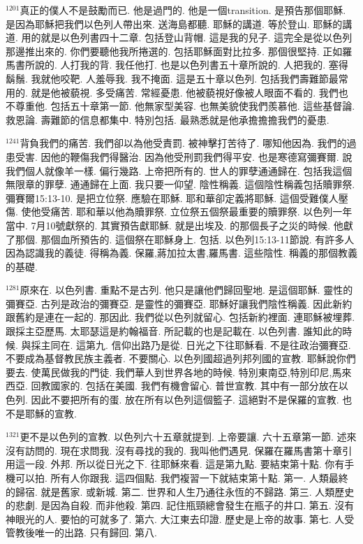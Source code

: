 \documentclass{book}
\begin{document}
$^{1201}$真正的僕人不是鼓勵而已.
他是過門的.
他是一個transition.
是預告那個耶穌.
是因為耶穌把我們以色列人帶出來.
送海島都聽.
耶穌的講道.
等於登山.
耶穌的講道.
用的就是以色列書四十二章.
包括登山背帽.
這是我的兒子.
這完全是從以色列那邊推出來的.
你們要聽他我所捲選的.
包括耶穌面對比拉多.
那個很堅持.
正如羅馬書所說的.
人打我的背.
我任他打.
也是以色列書五十章所說的.
人把我的.
塞得鬍鬚.
我就他咬靶.
人羞辱我.
我不掩面.
這是五十章以色列.
包括我們壽難節最常用的.
就是他被藐視.
多受痛苦.
常經憂患.
他被藐視好像被人眼面不看的.
我們也不尊重他.
包括五十章第一節.
他無家型美容.
也無美貌使我們羨慕他.
這些基督論.
救恩論.
壽難節的信息都集中.
特別包括.
最熟悉就是他承擔擔擔我們的憂患.

$^{1241}$背負我們的痛苦.
我們卻以為他受責罰.
被神擊打苦待了.
哪知他因為.
我們的過患受害.
因他的鞭傷我們得醫治.
因為他受刑罰我們得平安.
也是寒德寫彌賽爾.
說我們個人就像羊一樣.
偏行幾路.
上帝把所有的.
世人的罪孽通通歸在.
包括我這個無限章的罪孽.
通通歸在上面.
我只要一仰望.
陰性稱義.
這個陰性稱義包括贖罪祭.
彌賽爾15:13-10.
是把立位祭.
應驗在耶穌.
耶和華卻定義將耶穌.
這個受難僕人壓傷.
使他受痛苦.
耶和華以他為贖罪祭.
立位祭五個祭最重要的贖罪祭.
以色列一年當中.
7月10號獻祭的.
其實預告獻耶穌.
就是出埃及.
的那個長子之災的時候.
他獻了那個.
那個血所預告的.
這個祭在耶穌身上.
包括.
以色列15:13-11節說.
有許多人因為認識我的義徒.
得稱為義.
保羅,蔣加拉太書,羅馬書.
這些陰性.
稱義的那個教義的基礎.

$^{1281}$原來在.
以色列書.
重點不是古列.
他只是讓他們歸回聖地.
是這個耶穌.
靈性的彌賽亞.
古列是政治的彌賽亞.
是靈性的彌賽亞.
耶穌好讓我們陰性稱義.
因此新約跟舊約是連在一起的.
那因此.
我們從以色列就留心.
包括新約裡面.
連耶穌被埋葬.
跟採主亞歷馬.
太耶瑟這是約翰福音.
所記載的也是記載在.
以色列書.
誰知此的時候.
與採主同在.
這第九.
信仰出路乃是從.
日光之下往耶穌看.
不是往政治彌賽亞.
不要成為基督教民族主義者.
不要關心.
以色列國超過列邦列國的宣教.
耶穌說你們要去.
使萬民做我的門徒.
我們華人到世界各地的時候.
特別東南亞,特別印尼,馬來西亞.
回教國家的.
包括在美國.
我們有機會留心.
普世宣教.
其中有一部分放在以色列.
因此不要把所有的蛋.
放在所有以色列這個籃子.
這絕對不是保羅的宣教.
也不是耶穌的宣教.

$^{1321}$更不是以色列的宣教.
以色列六十五章就提到.
上帝要讓.
六十五章第一節.
述來沒有訪問的.
現在求問我.
沒有尋找的我的.
我叫他們遇見.
保羅在羅馬書第十章引用這一段.
外邦.
所以從日光之下.
往耶穌來看.
這是第九點.
要結束第十點.
你有手機可以拍.
所有人你跟我.
這四個點.
我們複習一下就結束第十點.
第一.
人類最終的歸宿.
就是舊家.
或新城.
第二.
世界和人生乃通往永恆的不歸路.
第三.
人類歷史的悲劇.
是因為自殺.
而非他殺.
第四.
記住瓶頸總會發生在瓶子的井口.
第五.
沒有神眼光的人.
要怕的可就多了.
第六.
大江東去印證.
歷史是上帝的故事.
第七.
人受管教後唯一的出路.
只有歸回.
第八.
\end{document}
